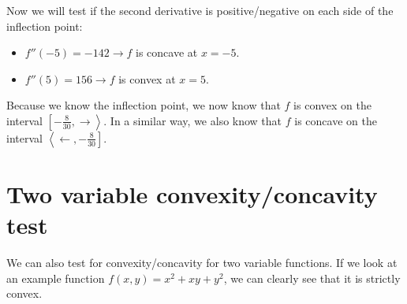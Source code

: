 \documentclass[11pt]{article}
\providecommand{\tightlist}{%
      \setlength{\itemsep}{0pt}\setlength{\parskip}{0pt}}
\begin{document}
Now we will test if the second derivative is positive/negative on each
side of the inflection point:

\begin{itemize}
\tightlist
\item
  \(f''(-5) = -142 \rightarrow f\) is concave at \(x=-5\).
\item
  \(f''(5) = 156 \rightarrow f\) is convex at \(x=5\).
\end{itemize}

Because we know the inflection point, we now know that \(f\) is convex
on the interval \(\left[-\frac{8}{30}, \rightarrow\right>\). In a
similar way, we also know that \(f\) is concave on the interval
\(\left<\leftarrow, -\frac{8}{30}\right]\).

    \hypertarget{two-variable-convexityconcavity-test}{%
\section{Two variable convexity/concavity
test}\label{two-variable-convexityconcavity-test}}

    We can also test for convexity/concavity for two variable functions. If
we look at an example function \(f(x,y)=x^2+xy+y^2\), we can clearly see
that it is strictly convex.
\end{document}
